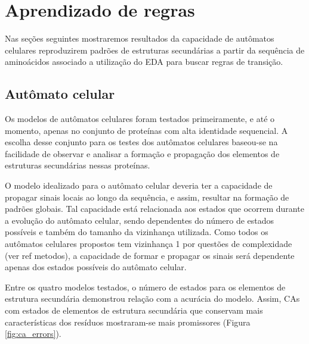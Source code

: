 \chapter{Aprendizado de regras}

Nas seções seguintes mostraremos resultados da capacidade de autômatos celulares reproduzirem padrões de estruturas secundárias a partir da sequência de aminoácidos associado a utilização do EDA para buscar regras de transição. 


\section{Autômato celular}

Os modelos de autômatos celulares foram testados primeiramente, e até o momento, apenas no conjunto de proteínas com alta identidade sequencial. A escolha desse conjunto para os testes dos autômatos celulares baseou-se na facilidade de observar e analisar a formação e propagação dos elementos de estruturas secundárias nessas proteínas.

O modelo idealizado para o autômato celular deveria ter a capacidade de propagar sinais locais ao longo da sequência, e assim, resultar na formação de padrões globais. Tal capacidade está relacionada aos estados que ocorrem durante a evolução do autômato celular, sendo dependentes do número de estados possíveis e também do tamanho da vizinhança utilizada. Como todos os autômatos celulares propostos tem vizinhança 1 por questões de complexidade (ver ref metodos), a capacidade de formar e propagar os sinais será dependente apenas dos estados possíveis do autômato celular.

Entre os quatro modelos testados, o número de estados para os elementos de estrutura secundária demonstrou relação com a acurácia do modelo. Assim, CAs com estados de elementos de estrutura secundária que conservam mais características dos resíduos mostraram-se mais promissores (Figura \ref{fig:ca_errors}).

